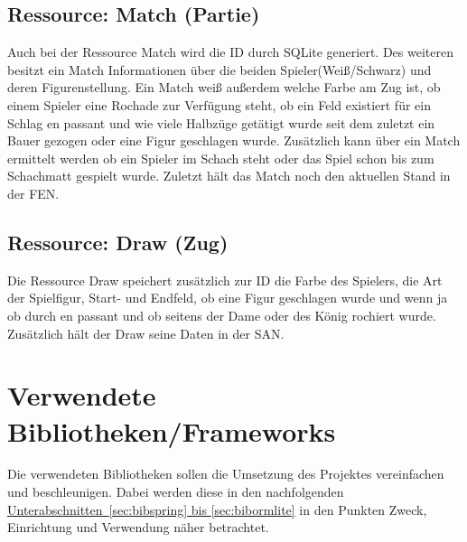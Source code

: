 \subsection{Ressource: Match (Partie)}\label{sec:resmatch}
Auch bei der Ressource Match wird die ID durch SQLite generiert. Des weiteren besitzt ein Match Informationen über die beiden Spieler(Weiß/Schwarz) und deren Figurenstellung. Ein Match weiß außerdem welche Farbe am Zug ist, ob einem Spieler eine Rochade zur Verfügung steht, ob ein Feld existiert für ein Schlag en passant und wie viele Halbzüge getätigt wurde seit dem zuletzt ein Bauer gezogen oder eine Figur geschlagen wurde. Zusätzlich kann über ein Match ermittelt werden ob ein Spieler im Schach steht oder das Spiel schon bis zum Schachmatt gespielt wurde. Zuletzt hält das Match noch den aktuellen Stand in der \gls{FEN}.

\subsection{Ressource: Draw (Zug)}\label{sec:resdraw}
Die Ressource Draw speichert zusätzlich zur ID die Farbe des Spielers, die Art der Spielfigur, Start- und Endfeld, ob eine Figur geschlagen wurde und wenn ja ob durch en passant und ob seitens der Dame oder des König rochiert wurde. Zusätzlich hält der Draw seine Daten in der \gls{SAN}.


\section{Verwendete Bibliotheken/Frameworks}
Die verwendeten Bibliotheken sollen die Umsetzung des Projektes vereinfachen und beschleunigen. Dabei werden diese in den nachfolgenden \hyperref[sec:bibspring, sec:bibormlite]{Unterabschnitten~\ref{sec:bibspring} bis \ref{sec:bibormlite}} in den Punkten Zweck, Einrichtung und Verwendung näher betrachtet. 

